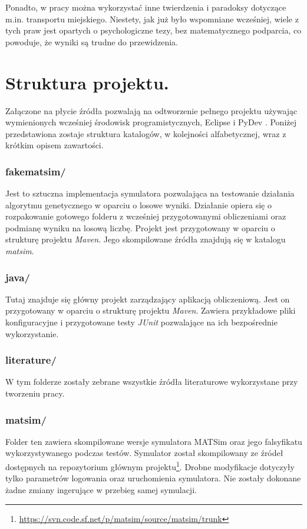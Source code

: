 \documentclass[twoside,12pt]{report}
\begin{document}
Ponadto, w pracy można wykorzystać inne twierdzenia i paradoksy dotyczące m.in. transportu miejskiego. Niestety, jak już było wspomniane wcześniej, wiele z tych praw jest opartych o psychologiczne tezy, bez matematycznego podparcia, co powoduje, że wyniki są trudne do przewidzenia.

\section{Struktura projektu.}

Załączone na płycie źródła pozwalają na odtworzenie pełnego projektu używając wymienionych wcześniej środowisk programistycznych, Eclipse \cite{eclipse} i PyDev \cite{pydev}. Poniżej przedstawiona zostaje struktura katalogów, w kolejności alfabetycznej, wraz z krótkim opisem zawartości.

\subsubsection{fakematsim/}
Jest to sztuczna implementacja symulatora pozwalająca na testowanie działania algorytmu genetycznego w oparciu o losowe wyniki. Działanie opiera się o rozpakowanie gotowego folderu z wcześniej przygotowanymi obliczeniami oraz podmianę wyniku na losową liczbę. Projekt jest przygotowany w oparciu o strukturę projektu \textit{Maven}. Jego skompilowane źródła znajdują się  w katalogu \textit{matsim}.

\subsubsection{java/}
Tutaj znajduje się główny projekt zarządzający aplikacją obliczeniową. Jest on przygotowany w oparciu o strukturę projektu \textit{Maven}. Zawiera przykładowe pliki konfiguracyjne i przygotowane testy \textit{JUnit} pozwalające na ich bezpośrednie wykorzystanie.

\subsubsection{literature/}
W tym folderze zostały zebrane wszystkie źródła literaturowe wykorzystane przy tworzeniu pracy.

\subsubsection{matsim/}
Folder ten zawiera skompilowane wersje symulatora MATSim oraz jego falsyfikatu wykorzystywanego podczas testów. Symulator został skompilowany ze źródeł dostępnych na repozytorium głównym projektu\footnote {\url{https://svn.code.sf.net/p/matsim/source/matsim/trunk}}. Drobne modyfikacje dotyczyły tylko parametrów logowania oraz uruchomienia symulatora. Nie zostały dokonane żadne zmiany ingerujące w przebieg samej symulacji.
\end{document}
